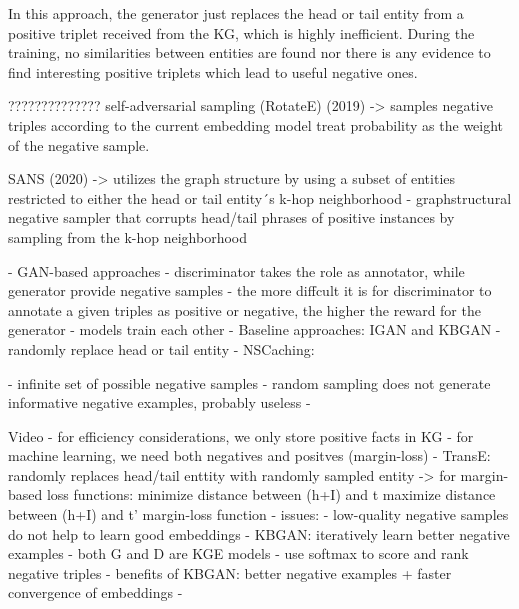     
    
In this approach, the generator just replaces the head or tail entity from a positive triplet received from the \ac{KG}, which is highly inefficient.
    During the training, no similarities between entities are found nor there is any evidence to find interesting positive triplets which lead to useful negative ones.
    
??????????????
    self-adversarial sampling (RotateE) (2019)
        -> samples negative triples according to the current embedding model
        treat probability as the weight of the negative sample.

    SANS (2020)
        -> utilizes the graph structure by using a subset of entities restricted to either the head or tail entity´s k-hop neighborhood
        - graphstructural negative sampler that corrupts
        head/tail phrases of positive instances by sampling
        from the k-hop neighborhood




- GAN-based approaches
- discriminator takes the role as annotator, while generator provide negative samples
- the more diffcult it is for discriminator to annotate a given triples as positive or negative, the higher the reward for the generator
- models train each other
- Baseline approaches: IGAN and KBGAN
- randomly replace head or tail entity
- NSCaching: 

- infinite set of possible negative samples
- random sampling does not generate informative negative examples, probably useless
- 



Video
- for efficiency considerations, we only store positive facts in KG
- for machine learning, we need both negatives and positves (margin-loss)
- TransE: randomly replaces head/tail enttity with randomly sampled entity
-> for margin-based loss functions: 
    minimize distance between (h+I) and t
    maximize distance between (h+I) and t'
    margin-loss function
- issues:
    - low-quality negative samples do not help to learn good embeddings
- KBGAN: iteratively learn  better negative examples
- both G and D are KGE models
- use softmax to score and rank negative triples
- benefits of KBGAN: better negative examples + faster convergence of embeddings
- 
    
